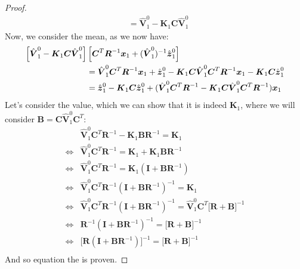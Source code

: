 \begin{proof}
\begin{equation*}
\begin{aligned}
        &= \hat{\boldsymbol V}^0_1 - \boldsymbol K_1\boldsymbol C\hat{\boldsymbol V}^0_1
    \end{aligned}
    \end{equation*}
    Now, we consider the mean, as we now have:
    \begin{equation*}
    \begin{aligned} 
        \Big[ \hat{\boldsymbol V}^0_1 - \boldsymbol K_1\boldsymbol C\hat{\boldsymbol V}^0_1 \Big]&\left[  \boldsymbol C^T\boldsymbol R^{-1}\boldsymbol x_1 + (\hat{\boldsymbol V}^0_1)^{-1}\hat{\boldsymbol z}^0_1 \right] \\
        &= \hat{\boldsymbol V}^0_1\boldsymbol C^T\boldsymbol R^{-1}\boldsymbol x_1 + \hat{\boldsymbol z}^0_1 - \boldsymbol K_1\boldsymbol C\hat{\boldsymbol V}^0_1\boldsymbol C^T\boldsymbol R^{-1}\boldsymbol x_1 - \boldsymbol K_1\boldsymbol C\hat{\boldsymbol z}^0_1 \\
        &= \hat{\boldsymbol z}^0_1 - \boldsymbol K_1\boldsymbol C\hat{\boldsymbol z}^0_1 + (\hat{\boldsymbol V}^0_1\boldsymbol C^T\boldsymbol R^{-1}  - \boldsymbol K_1\boldsymbol C\hat{\boldsymbol V}^0_1\boldsymbol C^T\boldsymbol R^{-1})\boldsymbol x_1 \\
    \end{aligned}
    \end{equation*}
    Let's consider the value, which we can show that it is indeed $\boldsymbol K_1$, where we will consider $\boldsymbol B = \boldsymbol C\hat{\boldsymbol V}^0_1\boldsymbol C^T$:
    \begin{equation*}
    \begin{aligned}
        &\hat{\boldsymbol V}^0_1\boldsymbol C^T\boldsymbol R^{-1}  - \boldsymbol K_1\boldsymbol B\boldsymbol R^{-1}  = \boldsymbol K_1\\
        \iff& \hat{\boldsymbol V}^0_1\boldsymbol C^T\boldsymbol R^{-1} = \boldsymbol K_1 + \boldsymbol K_1\boldsymbol B\boldsymbol R^{-1} \\
        \iff& \hat{\boldsymbol V}^0_1\boldsymbol C^T\boldsymbol R^{-1} = \boldsymbol K_1(\boldsymbol I + \boldsymbol B\boldsymbol R^{-1}) \\
        \iff& \hat{\boldsymbol V}^0_1\boldsymbol C^T\boldsymbol R^{-1}(\boldsymbol I + \boldsymbol B\boldsymbol R^{-1})^{-1} = \boldsymbol K_1 \\
        \iff& \hat{\boldsymbol V}^0_1\boldsymbol C^T\boldsymbol R^{-1}(\boldsymbol I + \boldsymbol B\boldsymbol R^{-1})^{-1} = \hat{\boldsymbol V}^0_1\boldsymbol C^T\Big[\boldsymbol R + \boldsymbol B\Big]^{-1} \\
        \iff& \boldsymbol R^{-1}(\boldsymbol I + \boldsymbol B\boldsymbol R^{-1})^{-1} = \Big[\boldsymbol R + \boldsymbol B\Big]^{-1} \\
        \iff& \Big[\boldsymbol R(\boldsymbol I + \boldsymbol B\boldsymbol R^{-1})\Big]^{-1} = \Big[\boldsymbol R + \boldsymbol B\Big]^{-1} \\
    \end{aligned}
    \end{equation*}
    And so equation the is proven. 
\end{proof}

